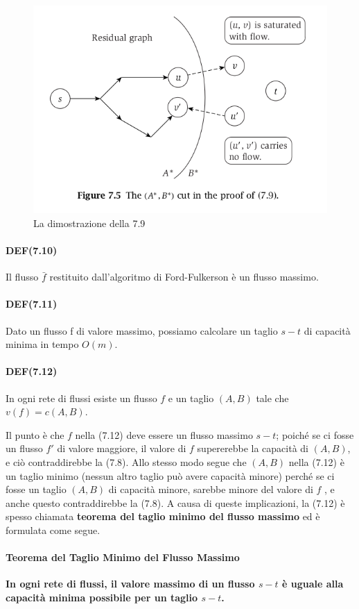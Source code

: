 \begin{figure}[H]
	\centering
	\includegraphics[width = 10 cm]{capitoli/network_flow/imgs/flow4.png}
	\caption{La dimostrazione della 7.9}
\end{figure}

\paragraph{DEF(7.10)}

\begin{myblockquote}
	Il flusso $\bar{f}$ restituito dall'algoritmo di Ford-Fulkerson è un
	flusso massimo.
\end{myblockquote}

\paragraph{DEF(7.11)}

\begin{myblockquote}
	Dato un flusso f di valore massimo, possiamo calcolare un taglio $s-t$
	di capacità minima in tempo $O(m)$.
\end{myblockquote}


\paragraph{DEF(7.12)}

\begin{myblockquote}
	In ogni rete di flussi esiste un flusso $f$ e un taglio $(A, B)$
	tale che $v(f) = c(A, B)$.
\end{myblockquote}

Il punto è che $f$ nella (7.12) deve essere un flusso massimo $s-t$;
poiché se ci fosse un flusso $f'$ di valore maggiore, il valore di
$f$ supererebbe la capacità di $(A, B)$, e ciò contraddirebbe la
(7.8). Allo stesso modo segue che $(A, B)$ nella (7.12) è un taglio
minimo (nessun altro taglio può avere capacità minore) perché se ci
fosse un taglio $(A , B)$ di capacità minore, sarebbe minore del
valore di $f$ , e anche questo contraddirebbe la (7.8). A causa di
queste implicazioni, la (7.12) è spesso chiamata \textbf{teorema del
	taglio minimo del flusso massimo} ed è formulata come segue.

\paragraph{Teorema del Taglio Minimo del Flusso Massimo}

\begin{myblockquote}
	\textbf{In ogni rete di flussi, il valore massimo di un flusso $s-t$ è
		uguale alla capacità minima possibile per un taglio $s-t$.}
\end{myblockquote}